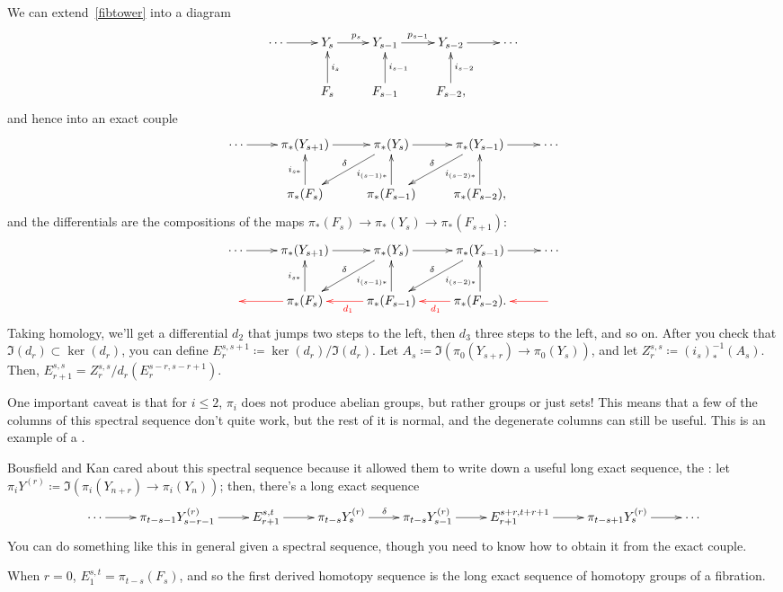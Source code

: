 We can extend~\eqref{fibtower} into a diagram
\[\xymatrix{
	\dotsb\ar[r] & Y_s\ar[r]^{p_s} & Y_{s-1}\ar[r]^{p_{s-1}} &Y_{s-2}\ar[r] & \dotsb\\
	& F_s\ar[u]_{i_s} & F_{s-1}\ar[u]_{i_{s-1}} & F_{s-2},\ar[u]_{i_{s-2}}
}\]
and hence into an exact couple
\[\xymatrix{
	\dotsb\ar[r] & \pi_*(Y_{s+1})\ar[r] & \pi_*(Y_s)\ar[r]\ar[dl]_\delta & \pi_*(Y_{s-1})\ar[dl]_\delta\ar[r] &
	\dotsb\\
	& \pi_*(F_{s})\ar[u]^{i_{s*}} & \pi_*(F_{s-1})\ar[u]^(0.4){i_{(s-1)*}} &
	\pi_*(F_{s-2}),\ar[u]^(0.4){i_{(s-2)*}}
}\]
and the differentials are the compositions of the maps $\pi_*(F_s)\to\pi_*(Y_s)\to \pi_*(F_{s+1})$:
\[\xymatrix{
	\dotsb\ar[r] & \pi_*(Y_{s+1})\ar[r] & \pi_*(Y_s)\ar[r]\ar[dl]_\delta & \pi_*(Y_{s-1})\ar[dl]_\delta\ar[r] &
	\dotsb\\
	& \pi_*(F_{s})\ar[u]^{i_{s*}}\ar@[red][l] & \pi_*(F_{s-1}) \ar[u]^(0.4){i_{(s-1)*}}
	\ar@[red][l]^{\textcolor{red}{d_1}} & \pi_*(F_{s-2}). \ar[u]^(0.4){i_{(s-2)*}}
	\ar@[red][l]^{\textcolor{red}{d_1}} &\ar@[red][l]
}\]
Taking homology, we'll get a differential $d_2$ that jumps two steps to the left, then $d_3$ three steps to the
left, and so on. After you check that $\Im(d_r)\subset\ker(d_r)$, you can define $E_r^{s,s+1}\coloneqq
\ker(d_r)/\Im(d_r)$. Let $A_s\coloneqq\Im(\pi_0(Y_{s+r})\to\pi_0(Y_s))$, and let $Z_r^{s,s}\coloneqq
(i_s)^{-1}_*(A_s)$. Then, $E_{r+1}^{s,s} = Z_r^{s,s} / d_r(E_r^{s-r, s-r+1})$.
\begin{rem}
One important caveat is that for $i\le 2$, $\pi_i$ does not produce abelian groups, but rather groups or just sets!
This means that a few of the columns of this spectral sequence don't quite work, but the rest of it is normal, and
the degenerate columns can still be useful. This is an example of a .
\end{rem}
Bousfield and Kan cared about this spectral sequence because it allowed them to write down a useful long exact
sequence, the : let
$\pi_iY^{(r)}\coloneqq \Im(\pi_i(Y_{n+r})\to\pi_i(Y_n))$; then, there's a long exact sequence
\[\xymatrix{
	\dotsb\ar[r] & \pi_{t-s-1}Y_{s-r-1}^{(r)}\ar[r] & E_{r+1}^{s,t}\ar[r] & \pi_{t-s}Y_s^{(r)}\ar[r]^\delta &
	\pi_{t-s}Y_{s-1}^{(r)}\ar[r] & E_{r+1}^{s+r, t+r+1}\ar[r] & \pi_{t-s+1}Y_s^{(r)}\ar[r] & \dotsb
}\]
You can do something like this in general given a spectral sequence, though you need to know how to obtain it from
the exact couple.
\begin{rem}
When $r = 0$, $E_1^{s,t} = \pi_{t-s}(F_s)$, and so the first derived homotopy sequence is the long exact sequence
of homotopy groups of a fibration.
\end{rem}
